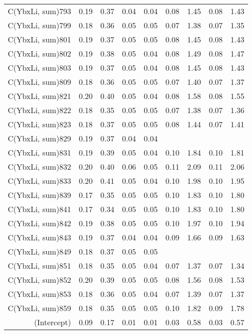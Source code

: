 \begin{table}[p]
\begin{tabular}{rrrrrrrrr}
  C(YbxLi, sum)793 & 0.19 & 0.37 & 0.04 & 0.04 & 0.08 & 1.45 & 0.08 & 1.43 \\ 
  C(YbxLi, sum)799 & 0.18 & 0.36 & 0.05 & 0.05 & 0.07 & 1.38 & 0.07 & 1.35 \\ 
  C(YbxLi, sum)801 & 0.19 & 0.37 & 0.05 & 0.05 & 0.08 & 1.45 & 0.08 & 1.43 \\ 
  C(YbxLi, sum)802 & 0.19 & 0.38 & 0.05 & 0.04 & 0.08 & 1.49 & 0.08 & 1.47 \\ 
  C(YbxLi, sum)803 & 0.19 & 0.37 & 0.05 & 0.04 & 0.08 & 1.45 & 0.08 & 1.43 \\ 
  C(YbxLi, sum)809 & 0.18 & 0.36 & 0.05 & 0.05 & 0.07 & 1.40 & 0.07 & 1.37 \\ 
  C(YbxLi, sum)821 & 0.20 & 0.40 & 0.05 & 0.04 & 0.08 & 1.58 & 0.08 & 1.55 \\ 
  C(YbxLi, sum)822 & 0.18 & 0.35 & 0.05 & 0.05 & 0.07 & 1.38 & 0.07 & 1.36 \\ 
  C(YbxLi, sum)823 & 0.18 & 0.37 & 0.05 & 0.05 & 0.08 & 1.44 & 0.07 & 1.41 \\ 
  C(YbxLi, sum)829 & 0.19 & 0.37 & 0.04 & 0.04 &  &  &  &  \\ 
  C(YbxLi, sum)831 & 0.19 & 0.39 & 0.05 & 0.04 & 0.10 & 1.84 & 0.10 & 1.81 \\ 
  C(YbxLi, sum)832 & 0.20 & 0.40 & 0.06 & 0.05 & 0.11 & 2.09 & 0.11 & 2.06 \\ 
  C(YbxLi, sum)833 & 0.20 & 0.41 & 0.05 & 0.04 & 0.10 & 1.98 & 0.10 & 1.95 \\ 
  C(YbxLi, sum)839 & 0.17 & 0.35 & 0.05 & 0.05 & 0.10 & 1.83 & 0.10 & 1.80 \\ 
  C(YbxLi, sum)841 & 0.17 & 0.34 & 0.05 & 0.05 & 0.10 & 1.83 & 0.10 & 1.80 \\ 
  C(YbxLi, sum)842 & 0.19 & 0.38 & 0.05 & 0.05 & 0.10 & 1.97 & 0.10 & 1.94 \\ 
  C(YbxLi, sum)843 & 0.19 & 0.37 & 0.04 & 0.04 & 0.09 & 1.66 & 0.09 & 1.63 \\ 
  C(YbxLi, sum)849 & 0.18 & 0.37 & 0.05 & 0.05 &  &  &  &  \\ 
  C(YbxLi, sum)851 & 0.18 & 0.35 & 0.05 & 0.04 & 0.07 & 1.37 & 0.07 & 1.34 \\ 
  C(YbxLi, sum)852 & 0.20 & 0.39 & 0.05 & 0.05 & 0.08 & 1.56 & 0.08 & 1.53 \\ 
  C(YbxLi, sum)853 & 0.18 & 0.36 & 0.05 & 0.04 & 0.07 & 1.39 & 0.07 & 1.37 \\ 
  C(YbxLi, sum)859 & 0.18 & 0.35 & 0.05 & 0.05 & 0.10 & 1.82 & 0.09 & 1.78 \\ 
  (Intercept) & 0.09 & 0.17 & 0.01 & 0.01 & 0.03 & 0.58 & 0.03 & 0.57 \\ 
   \hline
\end{tabular}
\end{table}
